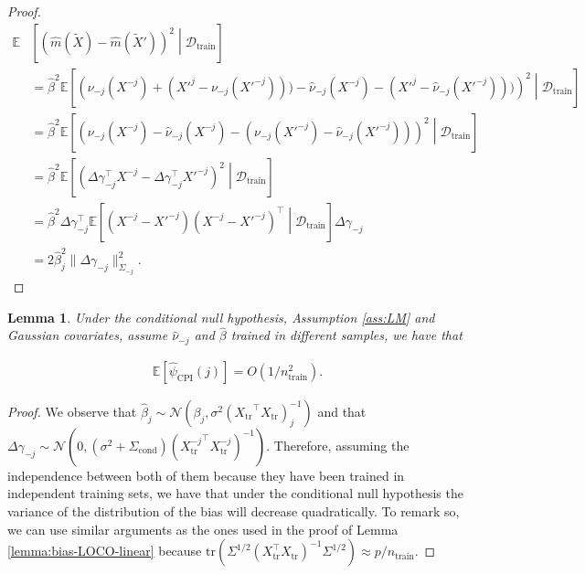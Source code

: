 \documentclass{article}
\theoremstyle{plain}
\newtheorem{lemma}[theorem]{Lemma}
\theoremstyle{definition}
\theoremstyle{remark}
\newcommand{\e}[1]{\mathbb{E}\left[#1\right]  } %
\begin{document}
\begin{proof}
\begin{align*}
    \mathbb{E}&\left[\left(\widehat{m}(\widetilde{X})-\widehat{m}(\widetilde{X}')\right)^2\middle|\mathcal{D}_\mathrm{train}\right]\\&= \widehat{\beta}^2 \e{\left(\nu_{-j}(X^{-j})+(X'^j-\nu_{-j}(X'^{-j})))-\widehat{\nu}_{-j}(X^{-j})-(X'^j-\widehat{\nu}_{-j}(X'^{-j})))\right)^2\middle|\mathcal{D}_\mathrm{train}}
    \\&=\widehat{\beta}^2 \e{\left(\nu_{-j}(X^{-j})-\widehat{\nu}_{-j}(X^{-j})-(\nu_{-j}(X'^{-j})-\widehat{\nu}_{-j}(X'^{-j}))\right)^2\middle|\mathcal{D}_\mathrm{train}}
     \\&=\widehat{\beta}^2 \e{\left(\Delta \gamma_{-j}^\top X^{-j}-\Delta\gamma_{-j}^\top X'^{-j}\right)^2\middle|\mathcal{D}_\mathrm{train}}
     \\&=\widehat{\beta}^2 \Delta\gamma_{-j}^\top\e{\left( X^{-j}- X'^{-j}\right)\left( X^{-j}- X'^{-j}\right)^\top\middle|\mathcal{D}_\mathrm{train}}\Delta \gamma_{-j}\\&=2\widehat{\beta}_j^2 \|\Delta \gamma_{-j}\|^2_{\Sigma_{-j}}.
\end{align*}

\end{proof}
 
 
 \begin{lemma}
Under the conditional null hypothesis, Assumption \ref{ass:LM} and Gaussian covariates, assume $\widehat{\nu}_{-j}$ and $\widehat{\beta}$ trained in different samples, we have that 

\begin{align*}
    \e{\widehat{\psi}_\mathrm{CPI}(j)}=O(1/n_\mathrm{train}^2).
\end{align*}
\end{lemma}


\begin{proof}
     We observe that $\widehat{\beta}_j\sim\mathcal{N}(\beta_j,\sigma^2({X_\mathrm{tr}}^\top X_\mathrm{tr})^{-1}_j)$ and that  $\Delta\gamma_{-j}\sim\mathcal{N}(0,(\sigma^2+\Sigma_\mathrm{cond}) ({X^{-j}_\mathrm{tr}}^\top X^{-j}_\mathrm{tr})^{-1})$. Therefore, assuming the independence between both of them because they have been trained in independent training sets, we have that under the conditional null hypothesis the variance of the distribution of the bias will decrease quadratically. To remark so, we can use similar arguments as the ones used in the proof of Lemma \ref{lemma:bias-LOCO-linear} because $\mathrm{tr}(\Sigma^{1/2}(X_\mathrm{tr}^\top X_\mathrm{tr})^{-1}\Sigma^{1/2})\approx p/n_\mathrm{train}$.
 \end{proof}
\end{document}
